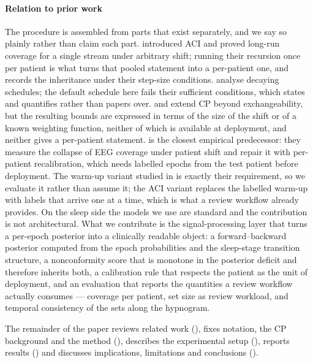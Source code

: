 \paragraph{Relation to prior work}
The procedure is assembled from parts that exist separately, and we say so
plainly rather than claim each part. \citet{gibbs2021} introduced ACI and
proved long-run coverage for a single stream under arbitrary shift; running
their recursion once per patient is what turns that pooled statement into a
per-patient one, and  records the inheritance under
their step-size conditions. \citet{angelopoulos2024} analyse decaying
schedules; the default schedule here fails their sufficient conditions, which
 states and quantifies rather than papers over.
\citet{barber2023} and \citet{tibshirani2019} extend CP beyond exchangeability,
but the resulting bounds are expressed in terms of the size of the shift or of
a known weighting function, neither of which is available at deployment, and
neither gives a per-patient statement. \citet{chatterjee2026} is the closest
empirical
predecessor: they measure the collapse of EEG coverage under patient shift and
repair it with per-patient recalibration, which needs labelled epochs from the
test patient before deployment. The warm-up variant studied in
 is exactly their requirement, so we evaluate it rather
than assume it; the ACI variant replaces the labelled warm-up with labels that
arrive one at a time, which is what a review workflow already provides. On the
sleep side the models we use are standard and the contribution is not
architectural. What we contribute is the signal-processing layer that turns a
per-epoch posterior into a clinically readable object: a forward--backward
posterior computed from the epoch probabilities and the sleep-stage
transition structure, a nonconformity score that is monotone in the posterior
deficit and therefore inherits both, a calibration rule that respects the
patient as the unit of deployment, and an evaluation that reports the
quantities a review workflow actually consumes --- coverage per patient, set
size as review workload, and temporal consistency of the sets along the
hypnogram.

The remainder of the paper reviews related work (), fixes
notation, the CP background and the method (), describes the
experimental setup (), reports results ()
and discusses implications, limitations and conclusions
().
